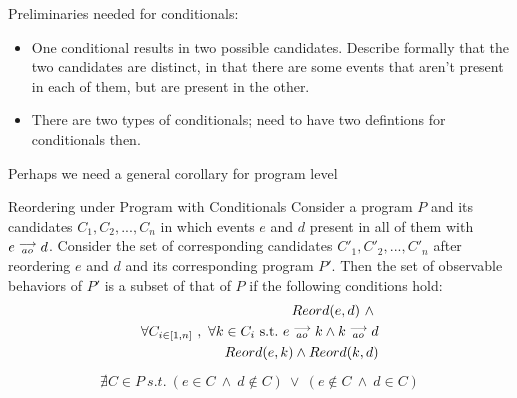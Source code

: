     
    Preliminaries needed for conditionals:
    \begin{itemize}
        \item One conditional results in two possible candidates. Describe formally that the two candidates are distinct, in that there are some events that aren't present in each of them, but are present in the other. 
        \item There are two types of conditionals; need to have two defintions for conditionals then. 
    \end{itemize}

    Perhaps we need a general corollary for program level 
    \begin{corollary}{Reordering under Program with Conditionals}
        Consider a program $P$ and its candidates $C_1, C_2, ... , C_n$ in which events $e$ and $d$ present in all of them with $e\stackrel{\longrightarrow}{_{ao}}d$. Consider the set of corresponding candidates $C'_1, C'_2, ... , C'_n$ after reordering $e$ and $d$ and its corresponding program $P'$. Then the set of observable behaviors of $P'$ is a subset of that of $P$ if the following conditions hold:
        \begin{align*}
            Reord(e,d) \ \wedge \ \\ 
            \forall C_{i \in [1,n]} \ , \ \forall k \in C_i \ \text{s.t.} \ \reln{e}{ao}{k} \wedge \reln{k}{ao}{d} \\ 
            Reord(e,k) \wedge Reord(k,d) 
        \end{align*}
        \begin{align*}
            \nexists C \in P \ s.t. \ 
                (e \in C \ \wedge \ d \notin C) \ \vee \ 
                (e \notin C \ \wedge \ d \in C) 
        \end{align*}
    \end{corollary}

